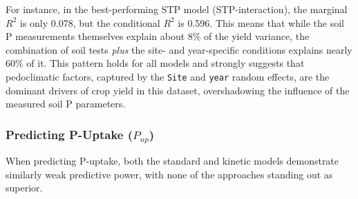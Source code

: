 \documentclass[
  a4paper,
]{article}
\begin{document}
For instance, in the best-performing STP model (STP-interaction), the
marginal \(R^2\) is only 0.078, but the conditional \(R^2\) is 0.596.
This means that while the soil P measurements themselves explain about
8\% of the yield variance, the combination of soil tests \emph{plus} the
site- and year-specific conditions explains nearly 60\% of it. This
pattern holds for all models and strongly suggests that pedoclimatic
factors, captured by the \texttt{Site} and \texttt{year} random effects,
are the dominant drivers of crop yield in this dataset, overshadowing
the influence of the measured soil P parameters.

\subsubsection{\texorpdfstring{Predicting P-Uptake
(\(P_{up}\))}{Predicting P-Uptake (P\_\{up\})}}\label{predicting-p-uptake-p_up}

When predicting P-uptake, both the standard and kinetic models
demonstrate similarly weak predictive power, with none of the approaches
standing out as superior.
\end{document}
